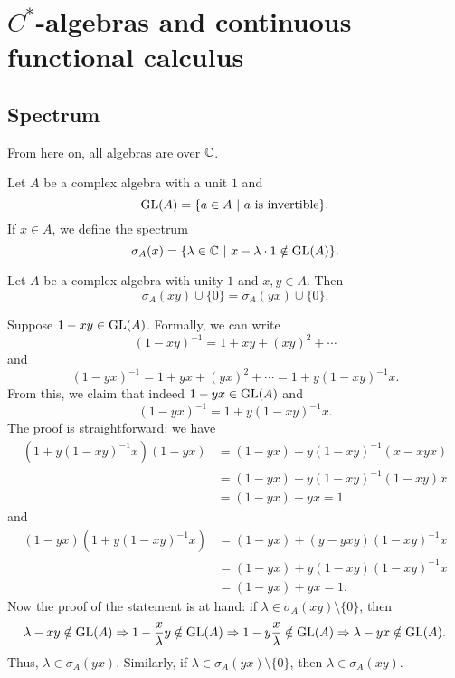 \section{$C^*$-algebras and continuous functional calculus}

\subsection{Spectrum}

\begin{remark}
  From here on, all algebras are over $\mathbb {C}$.
\end{remark}

Let $A$ be a complex algebra with a unit $1$ and 
$$\operatorname{GL} (A) = \{a \in A\ |\ \textrm{$a$ is invertible}\}.$$
If $x \in A$, we define the spectrum 
$$\sigma_A (x) = \{\lambda \in \mathbb {C}\ |\ x - \lambda \cdot 1 \notin \operatorname{GL}(A)\}.$$
\begin{proposition}\label{prop:2.1}
  Let $A$ be a complex algebra with unity $1$ and $x, y \in A$. Then 
  $$\sigma_A (xy) \cup \{0\} = \sigma_A (yx) \cup \{0\}.$$
\end{proposition}

\begin{myproof}
  Suppose $1 - xy \in \operatorname{GL}(A)$. Formally, we can write 
  $$(1 - xy)^{-1} = 1 + xy + (xy)^2 + \cdots$$
  and $$(1 - yx)^{-1} = 1 + yx + (yx)^2 + \cdots = 1 + y(1 - xy)^{-1} x.$$
  From this, we claim that indeed $1 - yx \in \operatorname{GL} (A)$ and 
  $$(1 - yx)^{-1} = 1 + y(1 - xy)^{-1} x.$$ 
  The proof is straightforward: we have
  \begin{align*}
    (1 + y(1 - xy)^{-1} x)(1 - yx) &= (1 - yx) + y(1 - xy)^{-1} (x - xyx)\\
    &= (1 - yx) + y (1 - xy)^{-1} (1 - xy) x\\
    &= (1 - yx) + yx = 1
  \end{align*} 
  and 
  \begin{align*}
    (1 - yx) (1 + y(1 - xy)^{-1} x) &= (1 - yx) + (y - yxy) (1 - xy)^{-1} x\\
    &= (1 - yx) + y(1 - xy) (1 - xy)^{-1} x\\
    &= (1 - yx) + yx = 1.
  \end{align*}
  Now the proof of the statement is at hand: if $\lambda \in \sigma_A (xy) \setminus \{0\}$,
  then \begin{align*}
    \lambda - xy \notin \operatorname{GL} (A) \Rightarrow 1 - \frac{x}{\lambda} y \notin \operatorname{GL} (A) \Rightarrow 1 - y \frac{x}{\lambda} \notin \operatorname{GL} (A) \Rightarrow \lambda - yx \notin \operatorname{GL} (A).
  \end{align*}
  Thus, $\lambda \in \sigma_A (yx)$.
  Similarly, if $\lambda \in \sigma_A (yx) \setminus \{0\}$, then $\lambda \in \sigma_A (xy)$.
\end{myproof}

